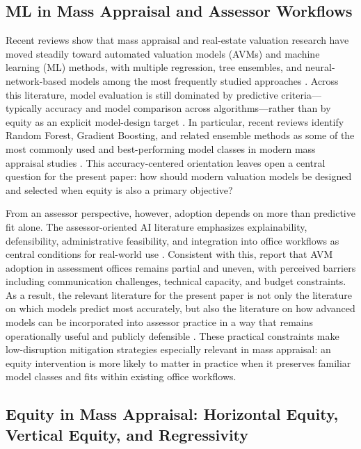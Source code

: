 \documentclass[12pt, draft]{article}
\theoremstyle{plain}
\theoremstyle{definition}
\newcommand{\1}{\mathbf{1}}
\begin{document}
\subsection{ML in Mass Appraisal and Assessor Workflows}

Recent reviews show that mass appraisal and real-estate valuation research have moved steadily toward automated valuation models (AVMs) and machine learning (ML) methods, with multiple regression, tree ensembles, and neural-network-based models among the most frequently studied approaches \cite{WangLi2019,Rootetal2023,Zilli2024,purdueAssessingTechniques}. Across this literature, model evaluation is still dominated by predictive criteria---typically accuracy and model comparison across algorithms---rather than by equity as an explicit model-design target \cite{WangLi2019,Rootetal2023,Zilli2024}. In particular, recent reviews identify Random Forest, Gradient Boosting, and related ensemble methods as some of the most commonly used and best-performing model classes in modern mass appraisal studies \cite{Rootetal2023,Sevgen2024100111,Zilli2024}. This accuracy-centered orientation leaves open a central question for the present paper: how should modern valuation models be designed and selected when equity is also a primary objective?

From an assessor perspective, however, adoption depends on more than predictive fit alone. The assessor-oriented AI literature emphasizes explainability, defensibility, administrative feasibility, and integration into office workflows as central conditions for real-world use \cite{IAAOAITaskForce2022}. Consistent with this, \textcite{BidansetRakow2022} report that AVM adoption in assessment offices remains partial and uneven, with perceived barriers including communication challenges, technical capacity, and budget constraints. As a result, the relevant literature for the present paper is not only the literature on which models predict most accurately, but also the literature on how advanced models can be incorporated into assessor practice in a way that remains operationally useful and publicly defensible \cite{IAAOAITaskForce2022,BidansetRakow2022}. These practical constraints make low-disruption mitigation strategies especially relevant in mass appraisal: an equity intervention is more likely to matter in practice when it preserves familiar model classes and fits within existing office workflows.

\subsection{Equity in Mass Appraisal: Horizontal Equity, Vertical Equity, and Regressivity}
\end{document}
